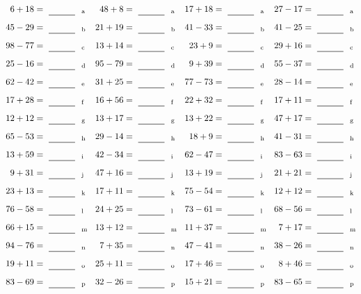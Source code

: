 \documentclass
[
  draft    = true,
  fontsize = 11pt,
  parskip  = half-
]
{scrartcl}
\begin{document}
\clearpage
\begin{align*}
    \pline{6+18}&=\rline{a}
  & \pline{48+8}&=\rline{a}
  & \pline{17+18}&=\rline{a}
  & \pline{27-17}&=\rline{a} \\[1ex]
    \pline{45-29}&=\rline{b}
  & \pline{21+19}&=\rline{b}
  & \pline{41-33}&=\rline{b}
  & \pline{41-25}&=\rline{b} \\[1ex]
    \pline{98-77}&=\rline{c}
  & \pline{13+14}&=\rline{c}
  & \pline{23+9}&=\rline{c}
  & \pline{29+16}&=\rline{c} \\[1ex]
    \pline{25-16}&=\rline{d}
  & \pline{95-79}&=\rline{d}
  & \pline{9+39}&=\rline{d}
  & \pline{55-37}&=\rline{d} \\[1ex]
    \pline{62-42}&=\rline{e}
  & \pline{31+25}&=\rline{e}
  & \pline{77-73}&=\rline{e}
  & \pline{28-14}&=\rline{e} \\[1ex]
    \pline{17+28}&=\rline{f}
  & \pline{16+56}&=\rline{f}
  & \pline{22+32}&=\rline{f}
  & \pline{17+11}&=\rline{f} \\[1ex]
    \pline{12+12}&=\rline{g}
  & \pline{13+17}&=\rline{g}
  & \pline{13+22}&=\rline{g}
  & \pline{47+17}&=\rline{g} \\[1ex]
    \pline{65-53}&=\rline{h}
  & \pline{29-14}&=\rline{h}
  & \pline{18+9}&=\rline{h}
  & \pline{41-31}&=\rline{h} \\[1ex]
    \pline{13+59}&=\rline{i}
  & \pline{42-34}&=\rline{i}
  & \pline{62-47}&=\rline{i}
  & \pline{83-63}&=\rline{i} \\[1ex]
    \pline{9+31}&=\rline{j}
  & \pline{47+16}&=\rline{j}
  & \pline{13+19}&=\rline{j}
  & \pline{21+21}&=\rline{j} \\[1ex]
    \pline{23+13}&=\rline{k}
  & \pline{17+11}&=\rline{k}
  & \pline{75-54}&=\rline{k}
  & \pline{12+12}&=\rline{k} \\[1ex]
    \pline{76-58}&=\rline{l}
  & \pline{24+25}&=\rline{l}
  & \pline{73-61}&=\rline{l}
  & \pline{68-56}&=\rline{l} \\[1ex]
    \pline{66+15}&=\rline{m}
  & \pline{13+12}&=\rline{m}
  & \pline{11+37}&=\rline{m}
  & \pline{7+17}&=\rline{m} \\[1ex]
    \pline{94-76}&=\rline{n}
  & \pline{7+35}&=\rline{n}
  & \pline{47-41}&=\rline{n}
  & \pline{38-26}&=\rline{n} \\[1ex]
    \pline{19+11}&=\rline{o}
  & \pline{25+11}&=\rline{o}
  & \pline{17+46}&=\rline{o}
  & \pline{8+46}&=\rline{o} \\[1ex]
    \pline{83-69}&=\rline{p}
  & \pline{32-26}&=\rline{p}
  & \pline{15+21}&=\rline{p}
  & \pline{83-65}&=\rline{p}
\end{align*}
\end{document}
